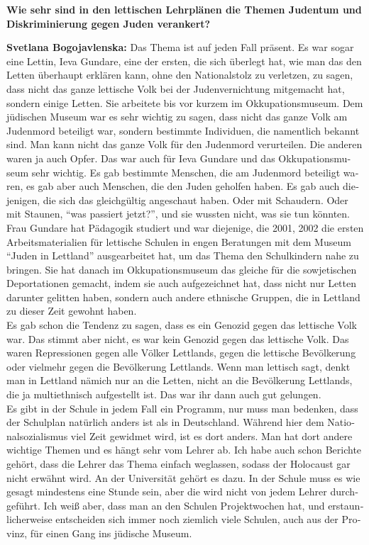 \begin{otherlanguage}{ngerman}
\textbf{Wie sehr sind in den lettischen Lehrplänen die Themen Judentum und Diskriminierung gegen Juden verankert?}

\textbf{Svetlana Bogojavlenska:} Das Thema ist auf jeden Fall präsent. Es war sogar eine Lettin, Ieva Gundare, eine der ersten, die sich überlegt hat, wie man das den Letten überhaupt erklären kann, ohne den Nationalstolz zu verletzen, zu sagen, dass nicht das ganze lettische Volk bei der Judenvernichtung mitgemacht hat, sondern einige Letten. Sie arbeitete bis vor kurzem im Okkupationsmuseum. Dem jüdischen Museum war es sehr wichtig zu sagen, dass nicht das ganze Volk am Judenmord beteiligt war, sondern bestimmte Individuen, die namentlich bekannt sind. Man kann nicht das ganze Volk für den Judenmord verurteilen. Die anderen waren ja auch Opfer. Das war auch für Ieva Gundare und das Okkupationsmuseum sehr wichtig. Es gab bestimmte Menschen, die am Judenmord beteiligt waren, es gab aber auch Menschen, die den Juden geholfen haben. Es gab auch diejenigen, die sich das gleichgültig angeschaut haben. Oder mit Schaudern. Oder mit Staunen, "`was passiert jetzt?"', und sie wussten nicht, was sie tun könnten.\\ 
Frau Gundare hat Pädagogik studiert und war diejenige, die 2001, 2002 die ersten Arbeitsmaterialien für lettische Schulen in engen Beratungen mit dem Museum "`Juden in Lettland"' ausgearbeitet hat, um das Thema den Schulkindern nahe zu bringen. Sie hat danach im Okkupationsmuseum das gleiche für die sowjetischen Deportationen gemacht, indem sie auch aufgezeichnet hat, dass nicht nur Letten darunter gelitten haben, sondern auch andere ethnische Gruppen, die in Lettland zu dieser Zeit gewohnt haben.\\
Es gab schon die Tendenz zu sagen, dass es ein Genozid gegen das lettische Volk war. Das stimmt aber nicht, es war kein Genozid gegen das lettische Volk. Das waren Repressionen gegen alle Völker Lettlands, gegen die lettische Bevölkerung oder vielmehr gegen die Bevölkerung Lettlands. Wenn man lettisch sagt, denkt man in Lettland nämich nur an die Letten, nicht an die Bevölkerung Lettlands, die ja multiethnisch aufgestellt ist. Das war ihr dann auch gut gelungen.\\
Es gibt in der Schule in jedem Fall ein Programm, nur muss man bedenken, dass der Schulplan natürlich anders ist als in Deutschland. Während hier dem Nationalsozialismus viel Zeit gewidmet wird, ist es dort anders. Man hat dort andere wichtige Themen und es hängt sehr vom Lehrer ab. Ich habe auch schon Berichte gehört, dass die Lehrer das Thema einfach weglassen, sodass der Holocaust gar nicht erwähnt wird. An der Universität gehört es dazu. In der Schule muss es wie gesagt mindestens eine Stunde sein, aber die wird nicht von jedem Lehrer durchgeführt. Ich weiß aber, dass man an den Schulen Projektwochen hat, und erstaunlicherweise entscheiden sich immer noch ziemlich viele Schulen, auch aus der Provinz, für einen Gang ins jüdische Museum.
\end{otherlanguage}
